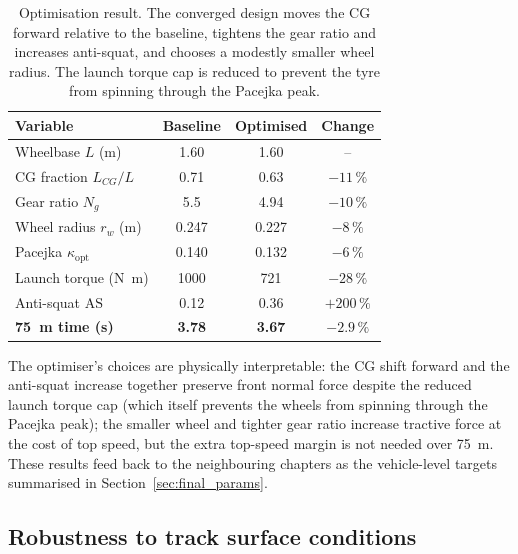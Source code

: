 \begin{table}[H]
\centering
\caption{Optimisation result. The converged design moves the CG
forward relative to the baseline, tightens the gear ratio and
increases anti-squat, and chooses a modestly smaller wheel radius.
The launch torque cap is reduced to prevent the tyre from spinning
through the Pacejka peak.}
\label{tab:optim_result}
\footnotesize
\begin{tabular}{|l|c|c|c|}
\hline
\textbf{Variable} & \textbf{Baseline} & \textbf{Optimised} & \textbf{Change} \\
\hline
Wheelbase $L$ (\si{\metre})      & 1.60 & 1.60 & -- \\
CG fraction $L_{CG}/L$           & 0.71 & 0.63 & $-11\,\%$ \\
Gear ratio $N_g$                 & 5.5 & 4.94 & $-10\,\%$ \\
Wheel radius $r_w$ (\si{\metre}) & 0.247 & 0.227 & $-8\,\%$ \\
Pacejka $\kappa_\text{opt}$      & 0.140 & 0.132 & $-6\,\%$ \\
Launch torque (\si{\newton\metre}) & 1000 & 721 & $-28\,\%$ \\
Anti-squat $\text{AS}$            & 0.12 & 0.36 & $+200\,\%$ \\
\hline
\textbf{\SI{75}{\metre} time (\si{\second})} & \textbf{3.78} & \textbf{3.67} & $\mathbf{-2.9\,\%}$ \\
\hline
\end{tabular}
\end{table}

The optimiser's choices are physically interpretable: the CG shift
forward and the anti-squat increase together preserve front normal
force despite the reduced launch torque cap (which itself prevents
the wheels from spinning through the Pacejka peak); the smaller
wheel and tighter gear ratio increase tractive force at the cost of
top speed, but the extra top-speed margin is not needed over
\SI{75}{\metre}. These results feed back to the neighbouring
chapters as the vehicle-level targets summarised in
Section~\ref{sec:final_params}.

\subsection{Robustness to track surface conditions}
\label{sec:drywet}

